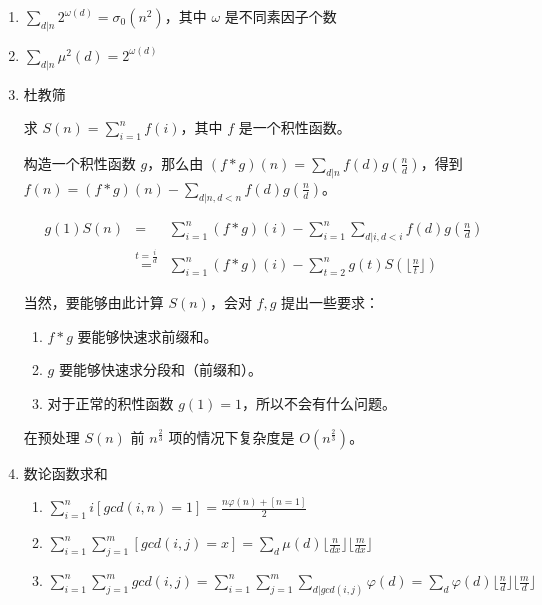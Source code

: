 \begin{enumerate}
\item $\sum_{d|n} 2^{\omega(d)}=\sigma_0(n^2)$，其中 $\omega$ 是不同素因子个数

\item $\sum_{d|n} \mu^2(d)=2^{\omega(d)}$

\item 杜教筛

求 $S(n)=\sum_{i=1}^n f(i)$，其中 $f$ 是一个积性函数。

构造一个积性函数 $g$，那么由 $(f*g)(n)=\sum_{d|n}f(d)g(\frac{n}{d})$，得到 $f(n)=(f*g)(n)-\sum_{d|n,d<n}f(d)g(\frac{n}{d})$。

\begin{eqnarray}
g(1)S(n)&=&\sum_{i=1}^n (f*g)(i)-\sum_{i= 1}^{n}\sum_{d|i,d<i}f(d)g(\frac{n}{d}) \\
&\overset{t=\frac{i}{d}}{=}& \sum_{i=1}^n (f*g)(i)-\sum_{t=2}^{n} g(t) S(\lfloor \frac{n}{t} \rfloor)
\end{eqnarray}


当然，要能够由此计算 $S(n)$，会对 $f,g$ 提出一些要求：

\begin{enumerate}
	
	\item $f*g$ 要能够快速求前缀和。
	
	\item $g$  要能够快速求分段和（前缀和）。
	
	\item 对于正常的积性函数 $g(1)=1$，所以不会有什么问题。

\end{enumerate}

在预处理 $S(n)$ 前 $n^{\frac{2}{3}}$ 项的情况下复杂度是 $O(n^{\frac{2}{3}})$。

\item 数论函数求和

\begin{enumerate}

	\item $\sum_{i=1}^n i[gcd(i, n)=1] = \frac {n \varphi(n) + [n=1]}{2}$
	
	\item $\sum_{i=1}^n \sum_{j=1}^m [gcd(i,j)=x]=\sum_d \mu(d) \lfloor \frac n {dx} \rfloor  \lfloor \frac m {dx} \rfloor$
	
	\item $\sum_{i=1}^n \sum_{j=1}^m gcd(i, j) = \sum_{i=1}^n \sum_{j=1}^m \sum_{d|gcd(i,j)} \varphi(d) = \sum_{d} \varphi(d) \lfloor \frac nd \rfloor \lfloor \frac md \rfloor$
	

\end{enumerate}
\end{enumerate}
